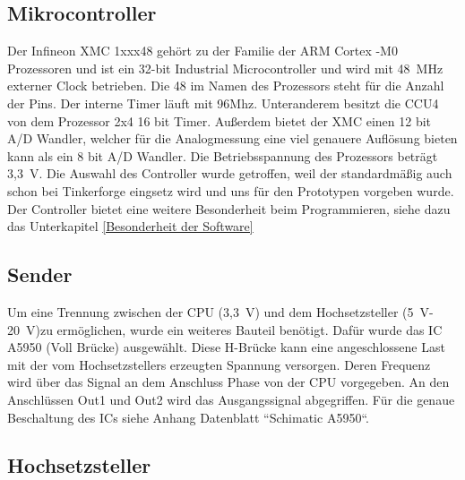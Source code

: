 

\subsection{Mikrocontroller}
Der Infineon XMC 1xxx48 gehört zu der Familie der ARM Cortex -M0 Prozessoren und ist ein 32-bit Industrial Microcontroller und wird mit 48~MHz externer Clock betrieben. Die 48 im Namen des Prozessors steht für die Anzahl der Pins. Der interne Timer läuft mit 96Mhz. Unteranderem besitzt die CCU4 von dem Prozessor 2x4 16 bit Timer. Außerdem bietet der XMC einen 12 bit A/D Wandler, welcher für die Analogmessung eine viel genauere Auflösung bieten kann als ein 8 bit A/D Wandler. Die Betriebsspannung des Prozessors beträgt 3,3~V. Die Auswahl des Controller wurde getroffen, weil der standardmäßig auch schon bei Tinkerforge eingsetz wird und uns für den Prototypen vorgeben wurde. Der Controller bietet eine weitere Besonderheit beim Programmieren, siehe dazu das Unterkapitel \ref{Besonderheit der Software}\\


\subsection{Sender}
Um eine Trennung zwischen der CPU (3,3~V) und dem Hochsetzsteller (5~V-20~V)zu ermöglichen, wurde ein weiteres Bauteil benötigt. Dafür wurde das IC A5950 (Voll Brücke) ausgewählt. Diese H-Brücke kann eine angeschlossene Last mit der vom Hochsetzstellers erzeugten Spannung versorgen. Deren Frequenz wird über das Signal an dem Anschluss Phase von der CPU vorgegeben. An den Anschlüssen Out1 und Out2 wird das Ausgangssignal abgegriffen. Für die genaue Beschaltung des ICs siehe Anhang Datenblatt “Schimatic A5950“.


\subsection{Hochsetzsteller}

